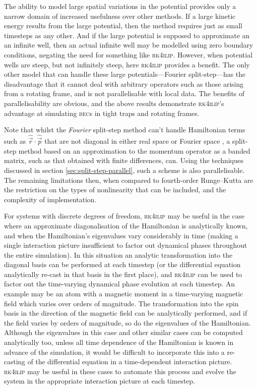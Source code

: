 The ability to model large spatial variations in the potential provides only a narrow domain of increased usefulness over other methods. If a large kinetic energy results from the large potential, then the method requires just as small timesteps as any other. And if the large potential is supposed to approximate an an infinite well, then an actual infinite well may be modelled using zero boundary conditions, negating the need for something like \textsc{rk4ilip}. However, when potential wells are steep, but not infinitely steep, here \textsc{rk4ilip} provides a benefit. The only other model that can handle these large potentials---Fourier split-step---has the disadvantage that it cannot deal with arbitrary operators such as those arising from a rotating frame, and is not parallelisable with local data. The benefits of parallelisability are obvious, and the above results demonstrate \textsc{rk4ilip}'s advantage at simulating \textsc{bec}s in tight traps and rotating frames.

Note that whilst the \emph{Fourier} split-step method can't handle Hamiltonian terms such as $\hat {\vec r} \cdot \hat {\vec p}$ that are not diagonal in either real space or Fourier space \cite[p.~315]{tannor_introduction_2007}, a split-step method based on an approximation to the momentum operator as a banded matrix, such as that obtained with finite differences, can. Using the techniques discussed in section \ref{sec:split-step-parallel}, such a scheme is also parallelisable. The remaining limitations then, when compared to fourth-order Runge--Kutta are the restriction on the types of nonlinearity that can be included, and the complexity of implementation.

For systems with discrete degrees of freedom, \textsc{rk4ilip} may be useful in the case where an approximate diagonalisation of the Hamiltonian is analytically known, and when the Hamiltonian's eigenvalues vary considerably in time (making a single interaction picture insufficient to factor out dynamical phases throughout the entire simulation). In this situation an analytic transformation into the diagonal basis can be performed at each timestep (or the differential equation analytically re-cast in that basis in the first place), and \textsc{rk4ilip} can be used to factor out the time-varying dynamical phase evolution at each timestep. An example may be an atom with a magnetic moment in a time-varying magnetic field which varies over orders of magnitude. The transformation into the spin basis in the direction of the magnetic field can be analytically performed, and if the field varies by orders of magnitude, so do the eigenvalues of the Hamiltonian. Although the eigenvalues in this case and other similar cases can be computed analytically too, unless all time dependence of the Hamiltonian is known in advance of the simulation, it would be difficult to incorporate this into a re-casting of the differential equation in a time-dependent interaction picture. \textsc{rk4ilip} may be useful in these cases to automate this process and evolve the system in the appropriate interaction picture at each timestep.
